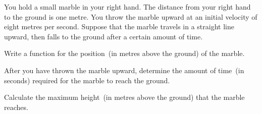 \documentclass[a4paper,oneside,12pt]{article}
\begin{document}
\begin{exercise}
You hold a small marble in your right hand.  The distance from your
right hand to the ground is one metre.  You throw the marble upward at
an initial velocity of eight metres per second.  Suppose that the
marble travels in a straight line upward, then falls to the ground
after a certain amount of time.
\begin{packedenum}
\item\label{subprob:marble_distance_function}
  Write a function for the position~(in metres above the ground) of
  the marble.

\item\label{subprob:marble_time_to_land}
  After you have thrown the marble upward, determine the amount of
  time~(in seconds) required for the marble to reach the ground.

\item\label{subprob:marble_maximum_height}
  Calculate the maximum height~(in metres above the ground) that the
  marble reaches.
\end{packedenum}
\end{exercise}
\end{document}
